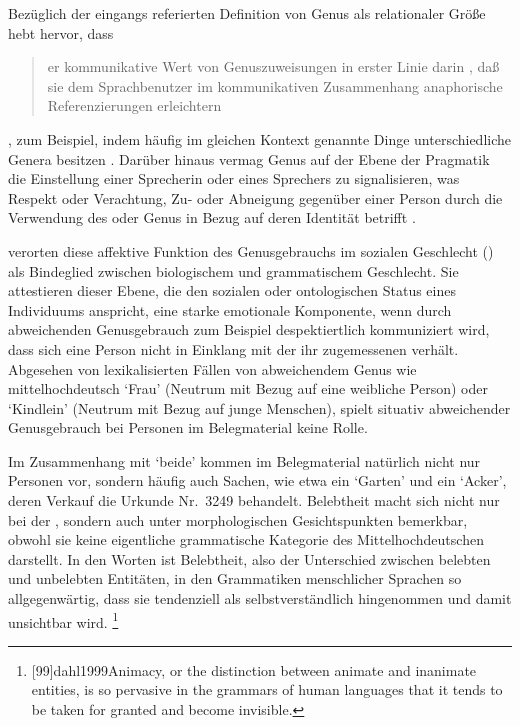 Bezüglich der eingangs referierten Definition von Genus als relationaler Größe
hebt \citet[42]{koepcke1982} hervor, dass \blockquote{er
kommunikative Wert von Genuszuweisungen \textelp{} in erster
Linie darin , daß sie dem Sprachbenutzer im kommunikativen
Zusammenhang anaphorische Referenzierungen
erleichtern}, zum Beispiel, indem häufig im gleichen Kontext genannte Dinge
unterschiedliche Genera besitzen \autocite[dazu auch][320--323]{corbett1991}.
Darüber hinaus vermag Genus auf der Ebene der Pragmatik die Einstellung einer
Sprecherin oder eines Sprechers zu signalisieren, was Respekt oder Verachtung,
Zu- oder Abneigung gegenüber einer Person durch die Verwendung des
 oder  Genus in Bezug auf deren
Identität betrifft \autocite[322--323]{corbett1991}.

\citet{steriopolosteriopolo2022} verorten diese affektive Funktion des
Genus\-gebrauchs im sozialen Geschlecht
() als Bindeglied zwischen
biologischem und grammatischem Geschlecht. Sie
attestieren dieser Ebene, die den sozialen oder ontologischen Status eines
Individuums anspricht, eine starke emotionale Komponente, wenn durch
abweichenden Genus\-gebrauch zum Beispiel
despektiertlich kommuniziert wird, dass sich eine Person nicht in Einklang mit
der ihr zugemessenen  verhält. Abgesehen von
lexikalisierten Fällen von abweichendem Genus wie
mittelhochdeutsch  `Frau' (Neutrum mit Bezug
auf eine weibliche Person) oder  `Kindlein' (Neutrum mit Bezug
auf junge Menschen), spielt situativ abweichender
Genusgebrauch bei Personen im Belegmaterial keine Rolle.

Im Zusammenhang mit  `beide' kommen im Belegmaterial natürlich
nicht nur Personen vor, sondern häufig auch Sachen, wie etwa ein 
`Garten' und ein  `Acker', deren Verkauf die Urkunde Nr.~3249
\autocites(Freiburg i.\,Br., 1299)[][417,2--14]{cao4} behandelt. Belebtheit
macht sich nicht nur bei der , sondern auch unter
morphologischen Gesichtspunkten bemerkbar, obwohl sie keine eigentliche
grammatische Kategorie des Mittelhochdeutschen darstellt.
In den Worten  ist Belebtheit, also der Unterschied
zwischen belebten und unbelebten Entitäten, in den Grammatiken
menschlicher Sprachen so allgegenwärtig, dass sie tendenziell als
selbstverständlich hingenommen und damit unsichtbar wird.%
%
	\footnote{[99]{dahl1999}{Animacy,
		or the distinction between animate and inanimate entities,
		is so pervasive in the grammars of human languages that it tends to be
		taken for granted and become invisible}.}

